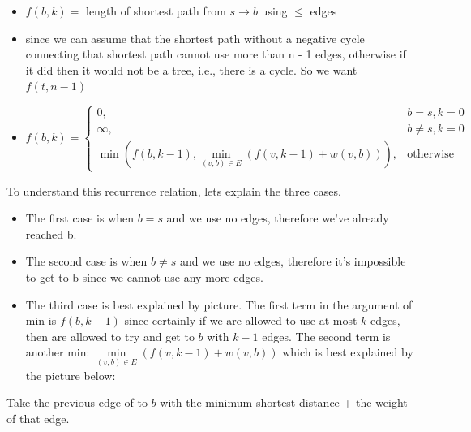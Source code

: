\documentclass[12pt]{article}
\begin{document}
\begin{itemize}
    \item $f(b,k) =$ length of shortest path from $s \rightarrow b$ using $\le$ edges
    \item since we can assume that the shortest path without a negative cycle connecting that shortest path cannot use more than n - 1 edges, otherwise if it did then it would not be a tree, i.e., there is a cycle. So we want $f(t, n - 1)$
    \item $$f(b, k) = \begin{cases}
                  0,                                                                    & b = s, k = 0     \\
                  \infty,                                                               & b \neq s, k = 0  \\
                  \min(f(b, k - 1), \min\limits_{(v, b) \in E}(f(v, k - 1) + w(v, b))), & \text{otherwise}
              \end{cases}
          $$
\end{itemize}
To understand this recurrence relation, lets explain the three cases.
\begin{itemize}
    \item The first case is when $b = s$ and we use no edges, therefore we've already reached b.
    \item The second case is when $b \ne s$ and we use no edges, therefore it's impossible to get to b since we cannot use any more edges.
    \item The third case is best explained by picture. The first term in the argument of min is $f(b, k - 1)$ since certainly if we are allowed to use at most $k$ edges, then are allowed to try and get to $b$ with $k - 1$ edges. The second term is another min: $\min\limits_{(v, b) \in E}(f(v, k - 1) + w(v, b))$ which is best explained by the picture below:
\end{itemize}
\begin{center}
\end{center}

Take the previous edge of to $b$ with the minimum shortest distance + the weight of that edge.
\end{document}

